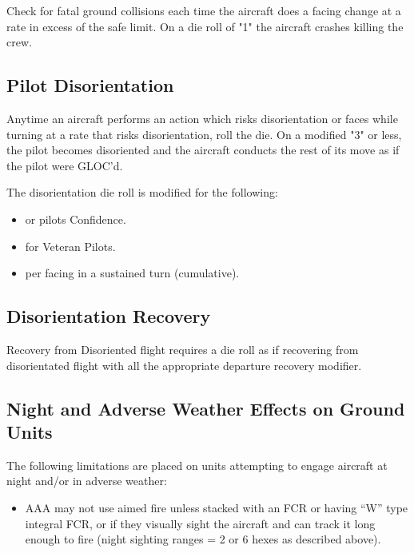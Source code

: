 \begin{advancedrules}
\begin{itemize}
    \end{itemize}

    Check for fatal ground collisions each time the aircraft does a facing change at a rate in excess of the safe limit. On a die roll of "1" the aircraft crashes killing the crew.

    \subsection{Pilot Disorientation} Anytime an aircraft performs an action which risks disorientation or faces while turning at a rate that risks disorientation, roll the die. On a modified "3" or less, the pilot becomes disoriented and the aircraft conducts the rest of its move as if the pilot were GLOC'd. 

    The disorientation die roll is modified for the following:
    \begin{itemize}
        \item \plus{} or \minus{} pilots Confidence.
        \item {} for Veteran Pilots.
        \item {} per facing in a sustained turn (cumulative).
    \end{itemize}

    \subsection{Disorientation Recovery} Recovery from Disoriented flight requires a die roll as if recovering from disorientated flight with all the appropriate departure recovery modifier.

    \subsection{Night and Adverse Weather Effects on Ground Units} The following limitations are placed on units attempting to engage aircraft at night and/or in adverse weather:

    \begin{itemize}

        \item AAA may not use aimed fire unless stacked with an FCR or having “W” type integral FCR, or if they visually sight the aircraft and can track it long enough to fire (night sighting ranges = 2 or 6 hexes as described above).


\end{itemize}
\end{advancedrules}
